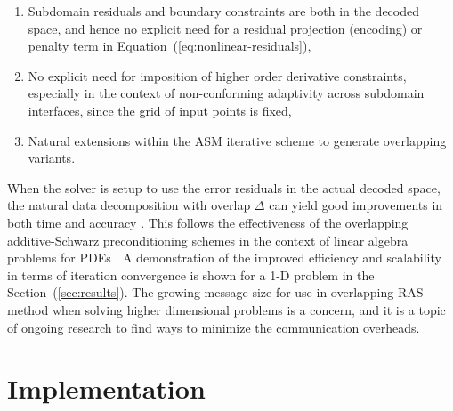 \documentclass[conference]{IEEEtran}
\newcommand{\eqt}[1]{Equation~(\ref{#1})}
\newcommand{\sect}[1]{Section~(\ref{#1})}
\begin{document}
\begin{enumerate}
	\item Subdomain residuals and boundary constraints are both in the decoded space, and hence no explicit need for a residual projection (encoding) or penalty term in \eqt{eq:nonlinear-residuals},
	\item No explicit need for imposition of higher order derivative constraints, especially in the context of non-conforming adaptivity across subdomain interfaces, since the grid of input points is fixed,
	\item Natural extensions within the ASM iterative scheme to generate overlapping variants.
\end{enumerate}


When the solver is setup to use the error residuals in the actual decoded space, the natural data decomposition with overlap $\Delta$ can yield good improvements in both time and accuracy \cite{bjorstad-overlap-1989}. This follows the effectiveness of the overlapping additive-Schwarz preconditioning schemes in the context of linear algebra problems for PDEs \cite{smith-ddm} \cite{gander-rasm}. A demonstration of the improved efficiency and scalability in terms of iteration convergence is shown for a 1-D problem in the \sect{sec:results}. The growing message size for use in overlapping RAS method when solving higher dimensional problems is a concern, and it is a topic of ongoing research to find ways to minimize the communication overheads.



\section{Implementation}
\label{sec:implementation}
\end{document}
